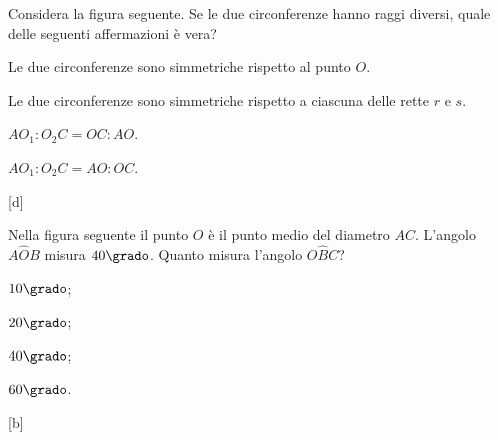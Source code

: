 \begin{esercizio}
\label{ese:5.67}
Considera la figura seguente. Se le due circonferenze hanno raggi 
diversi, quale delle seguenti affermazioni è vera?
\begin{enumeratea}
\item Le due circonferenze sono simmetriche rispetto al punto $O$.
\item Le due circonferenze sono simmetriche rispetto a ciascuna delle 
rette $r$ e $s$.
\item $AO_1:O_2C=OC:AO$.
\item $AO_1:O_2C=AO:OC$.
\end{enumeratea}
\hfill [d]
\end{esercizio}

\begin{inaccessibleblock}
 \begin{figure}[!htb]
	\centering
\end{figure}
\end{inaccessibleblock}

\noindent\begin{minipage}{0.65\textwidth}\parindent15pt
\begin{esercizio}
\label{ese:5.68}
Nella figura seguente il punto $O$ è il punto medio del diametro 
$AC$. L'angolo $A\widehat{O}B$ misura $40\grado$. Quanto misura 
l'angolo $O\widehat{B}C$? 
\begin{multicols}{4}
\begin{enumeratea}
\item $10\grado$;
\item $20\grado$;
\item $40\grado$;
\item $60\grado$.
\end{enumeratea}
\end{multicols}
\hfill [b]
\end{esercizio}
\end{minipage}\hfil
\begin{minipage}{0.35\textwidth}
	\centering
\end{minipage}\vspace{5pt}
